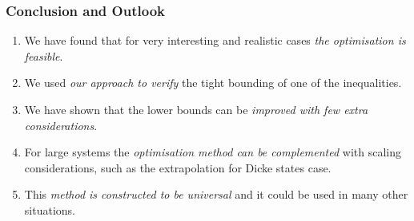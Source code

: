 \documentclass{beamer}
\begin{document}
	\begin{frame}
		\frametitle{Conclusion and Outlook}
		\begin{enumerate}
			\item<1-> We have found that for very interesting and realistic cases \emph{\color{blue}the optimisation is feasible}.
			\item<2-> We used \emph{\color{blue}our approach to verify} the tight bounding of one of the inequalities.
			\item<3-> We have shown that the lower bounds can be \emph{\color{blue}improved with few extra considerations}.
			\item<4-> For large systems the \emph{\color{blue}optimisation method can be complemented} with scaling considerations, such as the extrapolation for Dicke states case.
			\item<5-> This \emph{\color{blue}method is constructed to be universal} and it could be used in many other situations.
		\end{enumerate}

	\end{frame}


\end{document}
